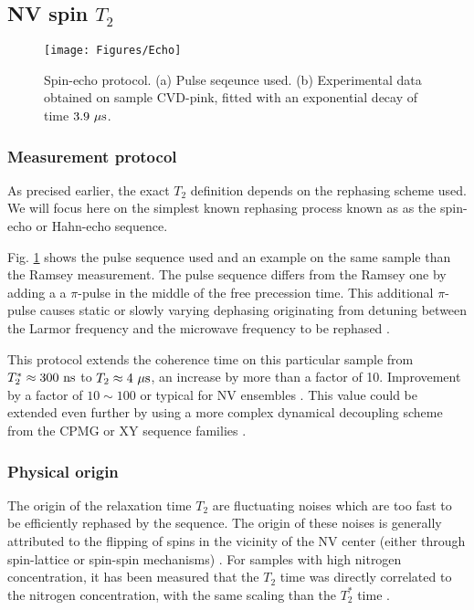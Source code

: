 \documentclass[a4paper,11pt]{report}
\begin{document}
\subsection{NV spin $T_2$}
\begin{figure}[h!]
\centering
\texttt{[image: Figures/Echo]}
\caption{Spin-echo protocol. (a) Pulse seqeunce used. (b) Experimental data obtained on sample CVD-pink, fitted with an exponential decay of time $3.9\ \rm{\mu s}$.} 
\label{Echo}
\end{figure}
\subsubsection{Measurement protocol}
As precised earlier, the exact $T_2$ definition depends on the rephasing scheme used. We will focus here on the simplest known rephasing process known as as the spin-echo or Hahn-echo sequence.

Fig. \ref{Echo} shows the pulse sequence used and an example on the same sample than the Ramsey measurement. The pulse sequence differs from the Ramsey one by adding a a $\pi$-pulse in the middle of the free precession time. This additional $\pi$-pulse causes static or slowly varying dephasing originating from detuning between the Larmor frequency and the microwave frequency to be rephased \citep{hahn1950spin}. 

This protocol extends the coherence time on this particular sample from $T_2^* \approx 300\ \rm ns$ to $T_2 \approx 4\ \rm{\mu s}$, an increase by more than a factor of 10. Improvement by a factor of $10 \sim 100$ or typical for NV ensembles \citep{barry2020sensitivity}. This value could be extended even further by using a more complex dynamical decoupling scheme from the CPMG or XY sequence families \citep{naydenov2011dynamical, bar2012suppression}.

\subsubsection{Physical origin}
The origin of the relaxation time $T_2$ are fluctuating noises which are too fast to be efficiently rephased by the sequence. The origin of these noises is generally attributed to the flipping of spins in the vicinity of the NV center (either through spin-lattice or spin-spin mechanisms) \citep{hall2014analytic}. For samples with high nitrogen concentration, it has been measured that the $T_2$ time  was directly correlated to the nitrogen concentration, with the same scaling than the $T_2^*$ time \citep{bauch2019decoherence}.
\end{document}
